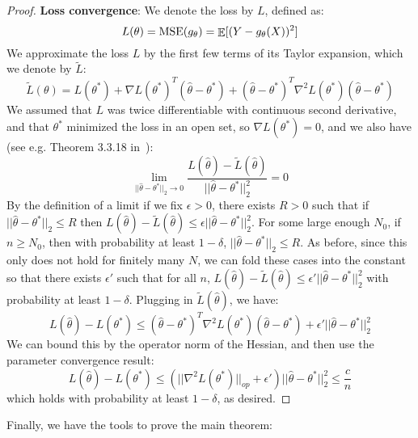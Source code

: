 \begin{proof}
\textbf{Loss convergence}: We denote the loss by $L$, defined as:
\[ L(\theta) = \textup{MSE}(g_{\theta}) = \mathop{\mathbb{E}}[ (Y - g_{\theta}(X))^2 ] \]
We approximate the loss $L$ by the first few terms of its Taylor expansion, which we denote by $\widetilde{L}$:
\[ \widetilde{L}(\theta) = L(\theta^*) + \nabla L(\theta^*)^T (\hat{\theta} - \theta^*) + (\hat{\theta} - \theta^*)^T \nabla^2 L(\theta^*) (\hat{\theta} - \theta^*) \]
We assumed that $L$ was twice differentiable with continuous second derivative, and that $\theta^*$ minimized the loss in an open set, so $\nabla L(\theta^*) = 0$, and we also have (see e.g. Theorem 3.3.18 in~\cite{hubbard1998vector}):
\[ \lim_{||\hat{\theta} - \theta^*||_2 \to 0} \frac{L(\hat{\theta}) - \widetilde{L}(\hat{\theta})}{||\hat{\theta} - \theta^*||_2^2} = 0 \]
By the definition of a limit if we fix $\epsilon > 0$, there exists $R > 0$ such that if $||\hat{\theta} - \theta^*||_2 \leq R$ then $L(\hat{\theta}) - \widetilde{L}(\hat{\theta}) \leq \epsilon ||\hat{\theta} - \theta^*||_2^2$. For some large enough $N_0$, if $n \geq N_0$, then with probability at least $1 - \delta$, $||\hat{\theta} - \theta^*||_2 \leq R$. As before, since this only does not hold for finitely many $N$, we can fold these cases into the constant so that there exists $\epsilon'$ such that for all $n$, $L(\hat{\theta}) - \widetilde{L}(\hat{\theta}) \leq \epsilon' ||\hat{\theta} - \theta^*||_2^2$ with probability at least $1 - \delta$. Plugging in $\widetilde{L}(\hat{\theta})$, we have:
\[ L(\hat{\theta}) - L(\theta^*) \leq (\hat{\theta} - \theta^*)^T \nabla^2 L(\theta^*) (\hat{\theta} - \theta^*) + \epsilon' ||\hat{\theta} - \theta^*||_2^2 \]
We can bound this by the operator norm of the Hessian, and then use the parameter convergence result:
\[ L(\hat{\theta}) - L(\theta^*) \leq (|| \nabla^2 L(\theta^*) ||_{op} + \epsilon') ||\hat{\theta} - \theta^*||_2^2 \leq \frac{c}{n} \]
which holds with probability at least $1 - \delta$, as desired.

\end{proof}

Finally, we have the tools to prove the main theorem:

